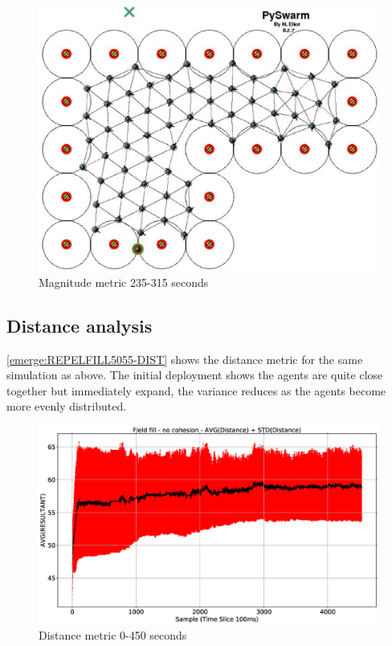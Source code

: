 \begin{figure}[H]
\begin{center}
\includegraphics[width=12cm]{CHAPTER-8/figures/REPELFILL5055-MAG-8}
\end{center}
\caption{Magnitude metric 235-315 seconds\label{emerge:REPELFILL5055-MAG-8}}
\end{figure}

\subsection{Distance analysis}
\autoref{emerge:REPELFILL5055-DIST} shows the distance metric for the same simulation as above. The initial deployment shows the agents are quite close together but immediately expand, the variance reduces as the agents become more evenly distributed. 

\begin{figure}[H]
\begin{center}
\includegraphics[width=12cm]{CHAPTER-8/figures/REPELFILL5055-DIST}
\end{center}
\caption{Distance metric 0-450 seconds\label{emerge:REPELFILL5055-DIST}}
\end{figure}


